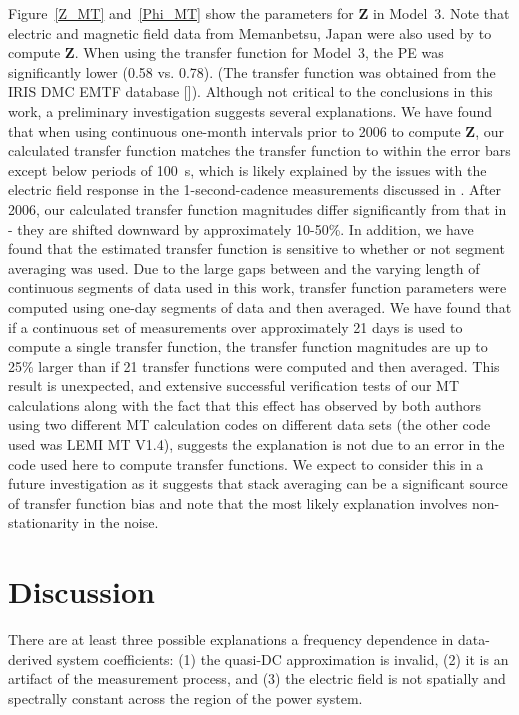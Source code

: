 \documentclass[draft,linenumbers]{agujournal2018}
\begin{document}
Figure~\ref{Z_MT} and~\ref{Phi_MT} show the parameters for $\mathbf{Z}$ in Model~3. Note that electric and magnetic field data from Memanbetsu, Japan were also used by \cite{Fujii2015} to compute $\mathbf{Z}$. When using the \cite{Fujii2015} transfer function for Model~3, the PE was significantly lower (0.58 vs. 0.78). (The \cite{Fujii2015} transfer function was obtained from the IRIS DMC EMTF database [\cite{Kelbert2011}]). Although not critical to the conclusions in this work, a preliminary investigation suggests several explanations. We have found that when using continuous one-month intervals prior to 2006 to compute $\mathbf{Z}$, our calculated transfer function matches the \cite{Fujii2015} transfer function to within the error bars except below periods of 100~s, which is likely explained by the issues with the electric field response in the 1-second-cadence measurements discussed in \cite{Fujii2015}. After 2006, our calculated transfer function magnitudes differ significantly from that in \cite{Fujii2015} - they are shifted downward by approximately 10-50\%. In addition, we have found that the estimated transfer function is sensitive to whether or not segment averaging was used. Due to the large gaps between and the varying length of continuous segments of data used in this work, transfer function parameters were computed using one-day segments of data and then averaged. We have found that if a continuous set of measurements over approximately 21 days is used to compute a single transfer function, the transfer function magnitudes are up to 25\% larger than if 21 transfer functions were computed and then averaged. This result is unexpected, and extensive successful verification tests of our MT calculations along with the fact that this effect has observed by both authors using two different MT calculation codes on different data sets (the other code used was LEMI MT V1.4), suggests the explanation is not due to an error in the code used here to compute transfer functions. We expect to consider this in a future investigation as it suggests that stack averaging can be a significant source of transfer function bias and note that the most likely explanation involves non-stationarity in the noise.

\section{Discussion}
\label{discussion}

There are at least three possible explanations a frequency dependence in data-derived system coefficients: (1) the quasi-DC approximation is invalid, (2) it is an artifact of the measurement process, and (3) the electric field is not spatially and spectrally constant across the region of the power system.
\end{document}
